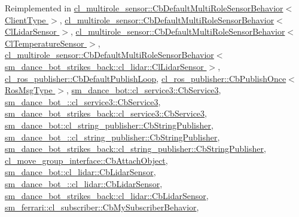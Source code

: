 Reimplemented in \hyperlink{classcl__multirole__sensor_1_1CbDefaultMultiRoleSensorBehavior_a5ac29f93cc91e23715f51ade94467cae}{cl\+\_\+multirole\+\_\+sensor\+::\+Cb\+Default\+Multi\+Role\+Sensor\+Behavior$<$ Client\+Type $>$}, \hyperlink{classcl__multirole__sensor_1_1CbDefaultMultiRoleSensorBehavior_a5ac29f93cc91e23715f51ade94467cae}{cl\+\_\+multirole\+\_\+sensor\+::\+Cb\+Default\+Multi\+Role\+Sensor\+Behavior$<$ Cl\+Lidar\+Sensor $>$}, \hyperlink{classcl__multirole__sensor_1_1CbDefaultMultiRoleSensorBehavior_a5ac29f93cc91e23715f51ade94467cae}{cl\+\_\+multirole\+\_\+sensor\+::\+Cb\+Default\+Multi\+Role\+Sensor\+Behavior$<$ Cl\+Temperature\+Sensor $>$}, \hyperlink{classcl__multirole__sensor_1_1CbDefaultMultiRoleSensorBehavior_a5ac29f93cc91e23715f51ade94467cae}{cl\+\_\+multirole\+\_\+sensor\+::\+Cb\+Default\+Multi\+Role\+Sensor\+Behavior$<$ sm\+\_\+dance\+\_\+bot\+\_\+strikes\+\_\+back\+::cl\+\_\+lidar\+::\+Cl\+Lidar\+Sensor $>$}, \hyperlink{classcl__ros__publisher_1_1CbDefaultPublishLoop_a6e6cfb477cbefc510ca7b55a061545e4}{cl\+\_\+ros\+\_\+publisher\+::\+Cb\+Default\+Publish\+Loop}, \hyperlink{classcl__ros__publisher_1_1CbPublishOnce_afaed71bc2694ec1837278d5f931a76e1}{cl\+\_\+ros\+\_\+publisher\+::\+Cb\+Publish\+Once$<$ Ros\+Msg\+Type $>$}, \hyperlink{classsm__dance__bot_1_1cl__service3_1_1CbService3_ae9e3796b507ad96cc0890fec0f64a4b7}{sm\+\_\+dance\+\_\+bot\+::cl\+\_\+service3\+::\+Cb\+Service3}, \hyperlink{classsm__dance__bot__2_1_1cl__service3_1_1CbService3_a179e43cc240f53f9c49c67094e41d75f}{sm\+\_\+dance\+\_\+bot\+\_\+::cl\+\_\+service3\+::\+Cb\+Service3}, \hyperlink{classsm__dance__bot__strikes__back_1_1cl__service3_1_1CbService3_a09a2fda38973e1e3915b63a47ca67ed1}{sm\+\_\+dance\+\_\+bot\+\_\+strikes\+\_\+back\+::cl\+\_\+service3\+::\+Cb\+Service3}, \hyperlink{classsm__dance__bot_1_1cl__string__publisher_1_1CbStringPublisher_a7aa533578e820ee90d92d15b85d42e9b}{sm\+\_\+dance\+\_\+bot\+::cl\+\_\+string\+\_\+publisher\+::\+Cb\+String\+Publisher}, \hyperlink{classsm__dance__bot__2_1_1cl__string__publisher_1_1CbStringPublisher_abc3c362ea55110f8d340e5cb4d901892}{sm\+\_\+dance\+\_\+bot\+\_\+::cl\+\_\+string\+\_\+publisher\+::\+Cb\+String\+Publisher}, \hyperlink{classsm__dance__bot__strikes__back_1_1cl__string__publisher_1_1CbStringPublisher_a2c3963143fe180a5e5f939362857d2e0}{sm\+\_\+dance\+\_\+bot\+\_\+strikes\+\_\+back\+::cl\+\_\+string\+\_\+publisher\+::\+Cb\+String\+Publisher}, \hyperlink{classcl__move__group__interface_1_1CbAttachObject_a05cd996ea25ee1b2ae74541a5ec56e98}{cl\+\_\+move\+\_\+group\+\_\+interface\+::\+Cb\+Attach\+Object}, \hyperlink{structsm__dance__bot_1_1cl__lidar_1_1CbLidarSensor_aad3468a6ae78999c9fd01bdb81b42a49}{sm\+\_\+dance\+\_\+bot\+::cl\+\_\+lidar\+::\+Cb\+Lidar\+Sensor}, \hyperlink{structsm__dance__bot__2_1_1cl__lidar_1_1CbLidarSensor_aad4085c114dd98c5e857d1a71c0309f8}{sm\+\_\+dance\+\_\+bot\+\_\+::cl\+\_\+lidar\+::\+Cb\+Lidar\+Sensor}, \hyperlink{structsm__dance__bot__strikes__back_1_1cl__lidar_1_1CbLidarSensor_a82d0250dcf2d4e9b12ccd528a5d87002}{sm\+\_\+dance\+\_\+bot\+\_\+strikes\+\_\+back\+::cl\+\_\+lidar\+::\+Cb\+Lidar\+Sensor}, \hyperlink{classsm__ferrari_1_1cl__subscriber_1_1CbMySubscriberBehavior_a16c8c5e65f02bd76081c3dc13367776a}{sm\+\_\+ferrari\+::cl\+\_\+subscriber\+::\+Cb\+My\+Subscriber\+Behavior}, 